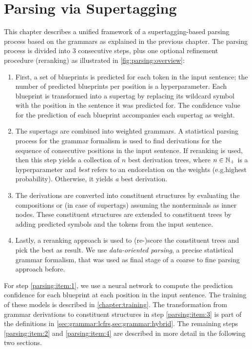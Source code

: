 \documentclass[../document.tex]{subfiles}
\begin{document}
    \chapter{Parsing via Supertagging}
    This chapter describes a unified framework of a supertagging-based parsing process based on the grammars as explained in the previous chapter.
    The parsing process is divided into 3 consecutive steps, plus one optional refinement procedure (reranking) as illustrated in \cref{fig:parsing:overview}:
    \begin{enumerate}
        \item\label{parsing:item:1}
            First, a set of blueprints is predicted for each token in the input sentence; the number of predicted blueprints per position is a hyperparameter.
            Each blueprint is transformed into a supertag by replacing its wildcard symbol with the position in the sentence it was predicted for.
            The confidence value for the prediction of each blueprint accompanies each supertag as weight.
        \item\label{parsing:item:2}
            The supertags are combined into weighted grammars.
            A statistical parsing process for the grammar formalism is used to find derivations for the sequence of consecutive positions in the input sentence.
            If reranking is used, then this step yields a collection of \(n\) best derivation trees, where \(n \in \mathbb{N}_+\) is a hyperparameter and \emph{best} refers to an endorelation on the weights (e.g.\@ highest probability).
            Otherwise, it yields \emph{a} best derivation.
        \item\label{parsing:item:3}
            The derivations are converted into constituent structures by evaluating the  compositions or (in case of  supertags) assuming the nonterminals as inner nodes.
            These constituent structures are extended to constituent trees by adding predicted  symbols and the tokens from the input sentence.
        \item\label{parsing:item:4}
            Lastly, a reranking approach is used to (re-)score the constituent trees and pick the best as result.
            We use \emph{data-oriented parsing}, a precise statistical grammar formalism, that was used as final stage of a coarse to fine parsing approach before. \cite{CraSchBod16}
    \end{enumerate}
    For step \ref{parsing:item:1}, we use a neural network to compute the prediction confidence for each blueprint at each position in the input sentence.
    The training of these models is described in \cref{chapter:training}.
    The transformation from grammar derivations to constituent structures in step \ref{parsing:item:3} is part of the definitions in \cref{sec:grammar:lcfrs,sec:grammar:hybrid}.
    The remaining steps \ref{parsing:item:2} and \ref{parsing:item:4} are described in more detail in the following two sections.
\end{document}
